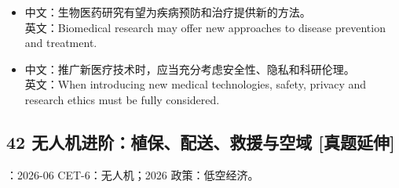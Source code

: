 \documentclass[a4paper,11pt,UTF8,fontset=none]{ctexart}
\begin{document}
\begin{itemize}[leftmargin=1.7em,itemsep=1pt,parsep=0pt,topsep=2pt]
\item \noindent 中文：生物医药研究有望为疾病预防和治疗提供新的方法。\\ 英文：Biomedical research may offer new approaches to disease prevention and treatment.\par


\item \noindent 中文：推广新医疗技术时，应当充分考虑安全性、隐私和科研伦理。\\ 英文：When introducing new medical technologies, safety, privacy and research ethics must be fully considered.\par


\end{itemize}

\subsection{42 无人机进阶：植保、配送、救援与空域 {\color{AccentBlue} [真题延伸]}}

\begin{tcolorbox}[enhanced,breakable,boxrule=0.35pt,colback=VeryPaleBlue,colframe=AccentBlue!40,left=7pt,right=7pt,top=4pt,bottom=4pt,borderline west={2pt}{0pt}{AccentBlue},before skip=4pt,after skip=6pt]
：2026-06 CET-6：无人机；2026 政策：低空经济。\par


\end{tcolorbox}
\end{document}
